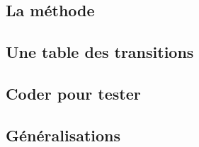 \subsection{La méthode}

    


\subsection{Une table des transitions}

    


\subsection{Coder pour tester}

    


\subsection{Généralisations}

    
